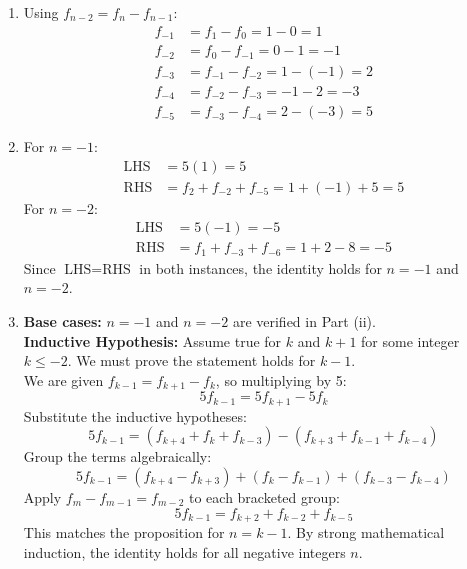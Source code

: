 \begin{solution}
\begin{enumerate}
    \item[(i)] Using $f_{n-2} = f_n - f_{n-1}$:
    \begin{align*}
        f_{-1} &= f_1 - f_0 = 1 - 0 = 1 \\
        f_{-2} &= f_0 - f_{-1} = 0 - 1 = -1 \\
        f_{-3} &= f_{-1} - f_{-2} = 1 - (-1) = 2 \\
        f_{-4} &= f_{-2} - f_{-3} = -1 - 2 = -3 \\
        f_{-5} &= f_{-3} - f_{-4} = 2 - (-3) = 5
    \end{align*}

    \item[(ii)] 
    For $n = -1$: 
    \begin{align*}
        \text{LHS} &= 5(1) = 5 \\
        \text{RHS} &= f_2 + f_{-2} + f_{-5} = 1 + (-1) + 5 = 5
    \end{align*}
    For $n = -2$:
    \begin{align*}
        \text{LHS} &= 5(-1) = -5 \\
        \text{RHS} &= f_1 + f_{-3} + f_{-6} = 1 + 2 - 8 = -5
    \end{align*}
    Since $\text{LHS} = \text{RHS}$ in both instances, the identity holds for $n=-1$ and $n=-2$.

    \item[(iii)] 
    \textbf{Base cases:} $n=-1$ and $n=-2$ are verified in Part (ii). \\
    \textbf{Inductive Hypothesis:} Assume true for $k$ and $k+1$ for some integer $k \le -2$. We must prove the statement holds for $k-1$. \\
    We are given $f_{k-1} = f_{k+1} - f_k$, so multiplying by 5:
    \[ 5f_{k-1} = 5f_{k+1} - 5f_k \]
    Substitute the inductive hypotheses:
    \[ 5f_{k-1} = (f_{k+4} + f_k + f_{k-3}) - (f_{k+3} + f_{k-1} + f_{k-4}) \]
    Group the terms algebraically:
    \[ 5f_{k-1} = (f_{k+4} - f_{k+3}) + (f_k - f_{k-1}) + (f_{k-3} - f_{k-4}) \]
    Apply $f_{m} - f_{m-1} = f_{m-2}$ to each bracketed group:
    \[ 5f_{k-1} = f_{k+2} + f_{k-2} + f_{k-5} \]
    This matches the proposition for $n = k-1$. By strong mathematical induction, the identity holds for all negative integers $n$.


\end{enumerate}
\end{solution}

